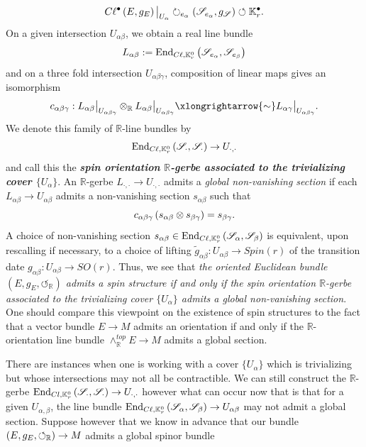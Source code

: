 \documentclass[openany, 11pt]{article}
\theoremstyle{definition}
\theoremstyle{remark}
\def\lp{\ensuremath{\left(}}
\def\rp{\ensuremath{\right)}}
\def\Sc{\ensuremath{\mathscr{S}}}
\def\cal{\ensuremath{\boldsymbol{\circlearrowleft}}}
\def\bR{\ensuremath{\mathbb{R}}}
\def\bK{\ensuremath{\mathbb{K}}}
\def\End{\ensuremath{\textnormal{End}}}
\begin{document}
\[
    C\ell^{\bullet}\lp E,g_E\rp\big|_{U_{\alpha}}\circlearrowright_{e_{\alpha}}\lp\Sc_{e_{\alpha}},g_{\Sc}\rp\circlearrowleft\bK^{\bullet}_r.
\]
On a given intersection $U_{\alpha\beta}$, we obtain a real line bundle
\[
    L_{\alpha\beta}:=\End_{C\ell,\bK^0_r}\lp\Sc_{e_{\alpha}},\Sc_{e_{\beta}}\rp
\]
and on a three fold intersection $U_{\alpha\beta\gamma}$, composition of linear maps gives an isomorphism 
\[
    c_{\alpha\beta\gamma}:L_{\alpha\beta}\big|_{U_{\alpha\beta\gamma}}\otimes_{\bR}L_{\alpha\beta}\big|_{U_{\alpha\beta\gamma}}\xlongrightarrow{\sim}L_{\alpha\gamma}\big|_{U_{\alpha\beta\gamma}}.
\]
We denote this family of $\bR$-line bundles by
\[
    \End_{C\ell,\bK_r^0}\lp\Sc_{\cdot},\Sc_{\cdot}\rp\rightarrow U_{\cdot,\cdot}
\]
and call this the \textbf{\emph{spin orientation $\bR$-gerbe associated to the trivializing cover $\{ U_{\alpha}\}$}}. An $\bR$-gerbe $L_{\cdot,\cdot}\rightarrow U_{\cdot,\cdot}$ admits a \emph{global non-vanishing section} if each $L_{\alpha\beta}\rightarrow U_{\alpha\beta}$ admits a non-vanishing section $s_{\alpha\beta}$ such that
\[
    c_{\alpha\beta\gamma}\lp s_{\alpha\beta}\otimes s_{\beta\gamma}\rp=s_{\beta\gamma}.
\]
A choice of non-vanishing section $s_{\alpha\beta}\in\End_{C\ell,\bK^0_r}\lp\Sc_{\alpha},\Sc_{\beta}\rp$ is equivalent, upon rescalling if necessary, to a choice of lifting $\tilde{g}_{\alpha\beta}:U_{\alpha\beta}\rightarrow Spin(r)$ of the transition date $g_{\alpha\beta}:U_{\alpha\beta}\rightarrow SO(r)$. Thus, we see that \emph{the oriented Euclidean bundle $(E,g_E,\cal_{\bR})$ admits a spin structure if and only if the spin orientation $\bR$-gerbe associated to the trivializing cover $\{ U_{\alpha}\}$ admits a global non-vanishing section}. One should compare this viewpoint on the existence of spin structures to the fact that a vector bundle $E\rightarrow M$ admits an orientation if and only if the $\bR$-orientation line bundle $\wedge^{top}_{\bR}E\rightarrow M$ admits a global section.\par
There are instances when one is working with a cover $\{U_{\alpha}\}$ which is trivializing but whose intersections may not all be contractible. We can still construct the $\bR$-gerbe $\End_{Cl,\bK^0_r}\lp\Sc_{\cdot},\Sc_{\cdot}\rp\rightarrow U_{\cdot,\cdot}$ however what can occur now that is that for a given $U_{\alpha,\beta}$, the line bundle $\End_{C\ell,\bK^0_r}\lp \Sc_{\alpha},\Sc_{\beta}\rp\rightarrow U_{\alpha\beta}$ may not admit a global section. Suppose however that we know in advance that our bundle $\lp E,g_E,\cal_{\bR}\rp\rightarrow M$ admits a global spinor bundle
\end{document}
